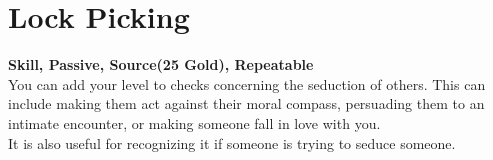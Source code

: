 \section{Lock Picking}\label{sec:lockPicking}
\textbf{Skill, Passive, Source(25 Gold), Repeatable}\\
You can add your level to checks concerning the seduction of others. This can include making them act against their moral compass, persuading them to an intimate encounter, or making someone fall in love with you.\\
It is also useful for recognizing it if someone is trying to seduce someone.